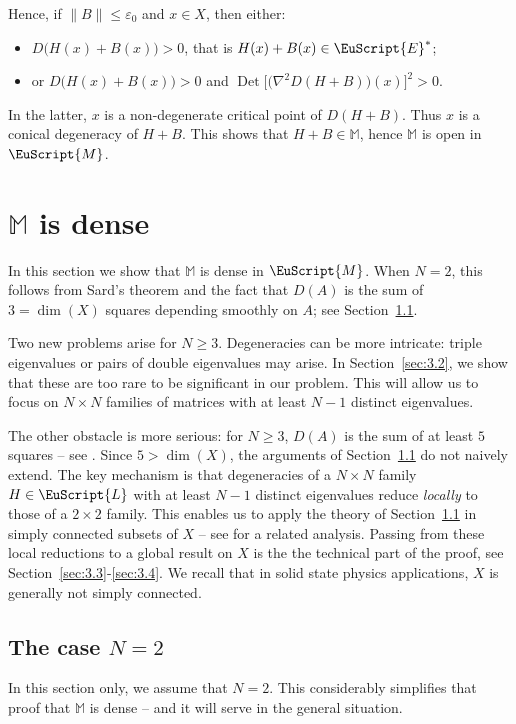 \documentclass[JEP,XML,SOM,Unicode,NoFloatCountersInSection]{cedram}
\let\pazocal\EuScript
\theoremstyle{definition}
\DeclareMathOperator{\Det}{Det}
\newcommand{\EE}{\pazocal{E}}
\newcommand{\MM}{\pazocal{M}}
\newcommand{\LL}{{\pazocal{L}}}
\newcommand{\Mm}{\mathbb{M}}
\let\epsi\varepsilon
\begin{document}
Hence, if $\| B \| \leq \epsi_0$ and $x \in X$, then either:
\begin{itemize}
\item $D \bigl( H(x) + B(x)\bigr) > 0$, that is $H(x) + B(x) \in \EE^*$;
\item or $D \bigl( H(x) + B(x)\bigr) > 0$ and $\Det\bigl[ \bigl(\nabla^2 D(H+B)\bigr)(x) \bigr]^2 >0$.
\end{itemize}
In the latter, $x$ is a non-degenerate critical point of $D(H+B)$. Thus $x$ is a conical degeneracy of $H+B$. This shows that $H+B \in \Mm$, hence $\Mm$ is open in $\MM$.

\section{\texorpdfstring{$\Mm$}{M} is dense}\label{sec:3}

In this section we show that $\Mm$ is dense in $\MM$. When $N = 2$, this follows from Sard's theorem and the fact that $D(A)$ is the sum of $3=\dim(X)$ squares depending smoothly on $A$; see Section~\ref{sec:3.1}.

Two new problems arise for $N \geq 3$. Degeneracies can be more intricate: triple eigenvalues or pairs of double eigenvalues may arise. In Section~\ref{sec:3.2}, we show that these are too rare to be significant in our problem. This will allow us to focus on $N \times N$ families of matrices with at least $N-1$ distinct eigenvalues.

The other obstacle is more serious: for $N \geq 3$, $D(A)$ is the sum of at least $5$ squares -- see \cite{D11}. Since $5 > \dim(X)$, the arguments of Section~\ref{sec:3.1} do not naively extend. The key mechanism is that degeneracies of a $N \times N$ family $H \in \LL$ with at least $N-1$ distinct eigenvalues reduce \textit{locally} to those of a $2 \times 2$ family. This enables us to apply the theory of Section~\ref{sec:3.1} in simply connected subsets of $X$ -- see \cite[\S4]{DP12} for a related analysis. Passing from these local reductions to a global result on $X$ is the the technical part of the proof, see Section~\ref{sec:3.3}-\ref{sec:3.4}. We recall that in solid state physics applications, $X$ is generally not simply connected.

\subsection{The case $N=2$}\label{sec:3.1} In this section only, we assume that $N=2$. This considerably simplifies that proof that $\Mm$ is dense -- and it will serve in the general situation.
\end{document}
